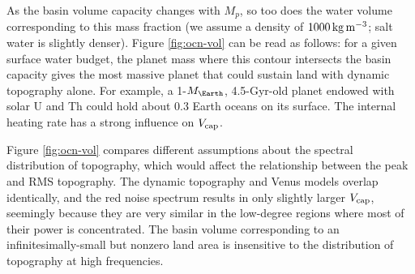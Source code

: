 \documentclass[trackchanges]{aastex63}
\newcommand{\jr}[1]{\textit{\textcolor{blue}{{#1}}}}
\begin{document}
As the basin volume capacity changes with $M_p$, so too does the water volume corresponding to this mass fraction (we assume a density of $1000\,\rm{kg\,m^{-3}}$; salt water is slightly denser). Figure \ref{fig:ocn-vol} can be read as follows: for a given surface water budget, the planet mass where this contour intersects the basin capacity gives the most massive planet that could sustain land with dynamic topography alone. For example, a 1-$M_\Earth$, 4.5-Gyr-old planet endowed with solar U and Th could hold about 0.3 Earth oceans on its surface. The internal heating rate has a strong influence on $V_{\rm cap}$.


Figure \ref{fig:ocn-vol} compares different assumptions about the spectral distribution of topography, which would affect the relationship between the peak and RMS topography. The dynamic topography and Venus models overlap identically, and the red noise spectrum results in only slightly larger $V_{\rm cap}$, seemingly because they are very similar in the low-degree regions where most of their power is concentrated. The basin volume corresponding to an infinitesimally-small but nonzero land area is insensitive to the distribution of topography at high frequencies.






\end{document}
